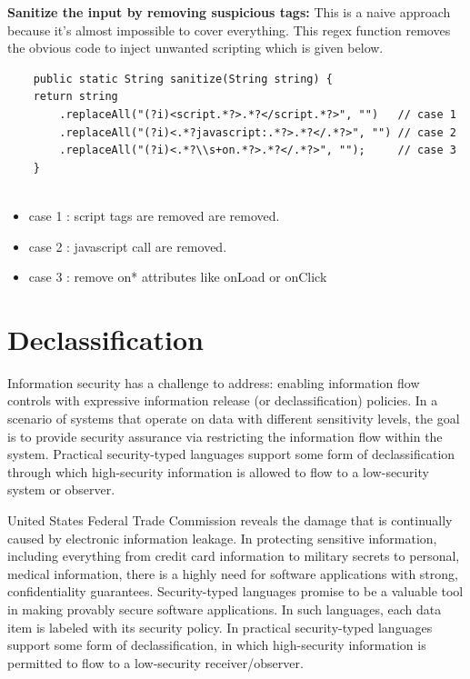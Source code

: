 \textbf{Sanitize the input by removing suspicious tags:}
This is a naive approach because it's almost impossible to cover everything. This regex function removes the obvious code to inject unwanted scripting which is given below.

\begin{lstlisting}
	public static String sanitize(String string) {
	return string
		.replaceAll("(?i)<script.*?>.*?</script.*?>", "")   // case 1
		.replaceAll("(?i)<.*?javascript:.*?>.*?</.*?>", "") // case 2
		.replaceAll("(?i)<.*?\\s+on.*?>.*?</.*?>", "");     // case 3
	}
	
\end{lstlisting}

\begin{itemize}
	\item case 1 : script tags are removed are removed.
	\item case 2 : javascript call are removed.
	\item case 3 : remove on* attributes like onLoad or onClick
\end{itemize}

\section{Declassification}
Information security has a challenge to address: enabling information flow controls with expressive information release (or declassification) policies. In a scenario of systems that operate on data with different sensitivity levels, the goal is to provide security assurance via restricting the information flow within the system. Practical security-typed languages support some form of declassification through which high-security information is allowed to flow to a low-security system or observer.

United States Federal Trade Commission reveals the damage that is continually caused by electronic information leakage. In protecting sensitive information, including everything from credit card information to military secrets to personal, medical information, there is a highly
need for software applications with strong, confidentiality guarantees.
Security-typed languages promise to be a valuable tool in making provably secure software applications. In such languages, each
data item is labeled with its security policy. In practical security-typed languages support some form of declassification, in which high-security information is permitted to flow to a low-security receiver/observer.

